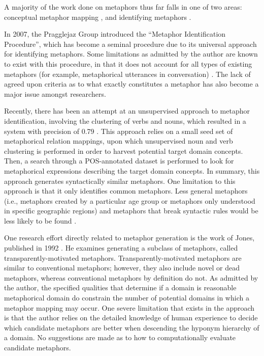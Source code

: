 \documentclass[12pt]{article}
\begin{document}
A majority of the work done on metaphors thus far falls in one of two areas: conceptual metaphor mapping \cite{lakoff89, lakoff80}, and identifying metaphors \cite{pragglejaz, shutova101}.

In 2007, the Pragglejaz Group introduced the ``Metaphor Identification Procedure'', which has become a seminal procedure due to its universal approach for identifying metaphors. Some limitations as admitted by the author are known to exist with this procedure, in that it does not account for all types of existing metaphors (for example, metaphorical utterances in conversation) \cite{pragglejaz}. The lack of agreed upon criteria as to what exactly constitutes a metaphor has also become a major issue amongst researchers.

Recently, there has been an attempt at an unsupervised approach to metaphor identification, involving the clustering of verbs and nouns, which resulted in a system with precision of 0.79 \cite{shutova101}. This approach relies on a small seed set of metaphorical relation mappings, upon which unsupervised noun and verb clustering is performed in order to harvest potential target domain concepts. Then, a search through a POS-annotated dataset is performed to look for metaphorical expressions describing the target domain concepts. In summary, this approach generates syntactically similar metaphors. One limitation to this approach is that it only identifies common metaphors. Less general metaphors (i.e., metaphors created by a particular age group or metaphors only understood in specific geographic regions) and metaphors that break syntactic rules would be less likely to be found \cite{gentner01}.

One research effort directly related to metaphor generation is the work of Jones, published in 1992 \cite{jones92}. He examines generating a subclass of metaphors, called transparently-motivated metaphors. Transparently-motivated metaphors are similar to conventional metaphors; however, they also include novel or dead metaphors, whereas conventional metaphors by definition do not. As admitted by the author, the specified qualities that determine if a domain is reasonable metaphorical domain do constrain the number of potential domains in which a metaphor mapping may occur. One severe limitation that exists in the approach is that the author relies on the detailed knowledge of human experience to decide which candidate metaphors are better when descending the hyponym hierarchy of a domain. No suggestions are made as to how to computationally evaluate candidate metaphors.
\end{document}

